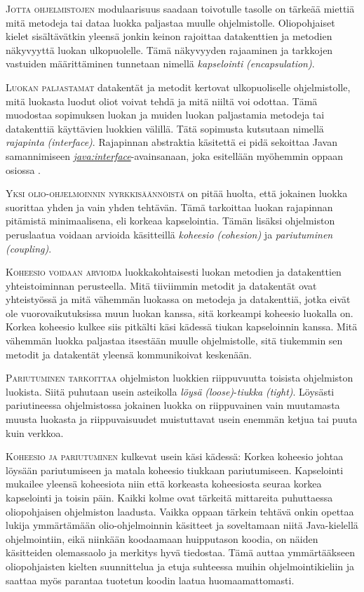 \documentclass[openany]{book}
\newcommand{\newthought}[1]{\smallskip\textsc{#1}}
\newcommand{\eng}[1]{\textit{(#1)}}
\newcommand{\new}[1]{\textit{\gls{#1}}}
\newcommand{\newnogls}[1]{\textit{#1}}
\newcommand{\neweng}[2]{\new{#1} \eng{#2}}
\newcommand{\newengnogls}[2]{\newnogls{#1} \eng{#2}}
\newcommand{\java}[1]{\underline{\gls{java:#1}}}
\newcommand{\newjava}[1]{\textit{\java{#1}}}
\begin{document}
\newthought{Jotta ohjelmistojen} modulaarisuus saadaan toivotulle tasolle on tärkeää miettiä mitä
metodeja tai dataa luokka paljastaa muulle ohjelmistolle. Oliopohjaiset kielet sisältävätkin
yleensä jonkin keinon rajoittaa datakenttien ja metodien näkyvyyttä luokan ulkopuolelle. Tämä
näkyvyyden rajaaminen ja tarkkojen vastuiden määrittäminen tunnetaan nimellä
\neweng{kapselointi}{encapsulation}.

\newthought{Luokan paljastamat} datakentät ja metodit kertovat ulkopuoliselle ohjelmistolle, mitä
luokasta luodut oliot voivat tehdä ja mitä niiltä voi odottaa. Tämä muodostaa sopimuksen luokan ja
muiden luokan paljastamia metodeja tai datakenttiä käyttävien luokkien välillä. Tätä sopimusta
kutsutaan nimellä \neweng{rajapinta}{interface}. Rajapinnan abstraktia käsitettä ei pidä sekoittaa
Javan samannimiseen \newjava{interface}-avainsanaan, joka esitellään myöhemmin oppaan osiossa
.

\newthought{Yksi olio-ohjelmoinnin nyrkkisäännöistä} on pitää huolta, että jokainen luokka
suorittaa yhden ja vain yhden tehtävän. Tämä tarkoittaa luokan rajapinnan pitämistä minimaalisena,
eli korkeaa kapselointia. Tämän lisäksi ohjelmiston peruslaatua voidaan arvioida käsitteillä
\neweng{koheesio}{cohesion} ja \neweng{pariutuminen}{coupling}.

\newthought{Koheesio voidaan arvioida} luokkakohtaisesti luokan metodien ja datakenttien
yhteistoiminnan perusteella. Mitä tiiviimmin metodit ja datakentät ovat yhteistyössä ja mitä
vähemmän luokassa on metodeja ja datakenttiä, jotka eivät ole vuorovaikutuksissa muun luokan
kanssa, sitä korkeampi koheesio luokalla on. Korkea koheesio kulkee siis pitkälti käsi kädessä
tiukan kapseloinnin kanssa. Mitä vähemmän luokka paljastaa itsestään muulle ohjelmistolle, sitä
tiukemmin sen metodit ja datakentät yleensä kommunikoivat keskenään.

\newthought{Pariutuminen tarkoittaa} ohjelmiston luokkien riippuvuutta toisista ohjelmiston
luokista. Siitä puhutaan usein asteikolla \newengnogls{löysä}{loose}-\newengnogls{tiukka}{tight}.
Löysästi pariutineessa ohjelmistossa jokainen luokka on riippuvainen vain muutamasta muusta
luokasta ja riippuvaisuudet muistuttavat usein enemmän ketjua tai puuta kuin verkkoa.

\newthought{Koheesio ja pariutuminen} kulkevat usein käsi kädessä: Korkea koheesio johtaa löysään
pariutumiseen ja matala koheesio tiukkaan pariutumiseen. Kapselointi mukailee yleensä koheesiota
niin että korkeasta koheesiosta seuraa korkea kapselointi ja toisin päin. Kaikki kolme ovat
tärkeitä mittareita puhuttaessa oliopohjaisen ohjelmiston laadusta. Vaikka oppaan tärkein tehtävä
onkin opettaa lukija ymmärtämään olio-ohjelmoinnin käsitteet ja soveltamaan niitä
Java-kielellä ohjelmointiin, eikä niinkään koodaamaan huipputason koodia, on näiden käsitteiden
olemassaolo ja merkitys hyvä tiedostaa. Tämä auttaa ymmärtääkseen oliopohjaisten kielten
suunnittelua ja etuja suhteessa muihin ohjelmointikieliin ja saattaa myös parantaa tuotetun koodin
laatua huomaamattomasti.
\end{document}
